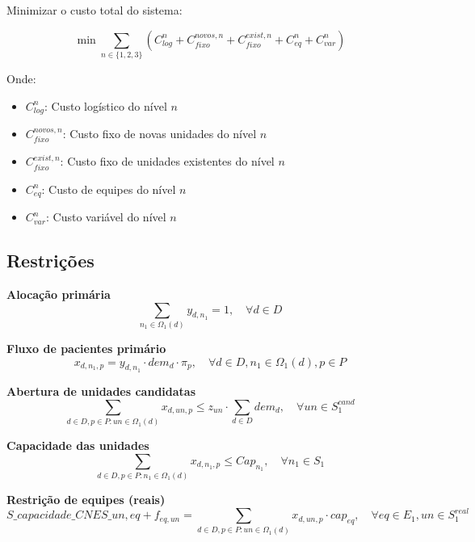 \documentclass{article}
\begin{document}
Minimizar o custo total do sistema:

\begin{equation}
\min \sum_{n \in \{1,2,3\}} \left( C_{log}^n + C_{fixo}^{novos,n} + C_{fixo}^{exist,n} + C_{eq}^n + C_{var}^n \right)
\end{equation}

Onde:
\begin{itemize}
    \item $C_{log}^n$: Custo logístico do nível $n$
    \item $C_{fixo}^{novos,n}$: Custo fixo de novas unidades do nível $n$
    \item $C_{fixo}^{exist,n}$: Custo fixo de unidades existentes do nível $n$
    \item $C_{eq}^n$: Custo de equipes do nível $n$
    \item $C_{var}^n$: Custo variável do nível $n$
\end{itemize}

\subsection{Restrições}

\textbf{Alocação primária}
\begin{equation}
\sum_{n_1 \in \Omega_1(d)} y_{d,n_1} = 1, \quad \forall d \in D \tag{1}
\end{equation}

\textbf{Fluxo de pacientes primário}
\begin{equation}
x_{d,n_1,p} = y_{d,n_1} \cdot dem_d \cdot \pi_p, \quad \forall d \in D, n_1 \in \Omega_1(d), p \in P \tag{2}
\end{equation}

\textbf{Abertura de unidades candidatas}
\begin{equation}
\sum_{d \in D, p \in P: un \in \Omega_1(d)} x_{d,un,p} \leq z_{un} \cdot \sum_{d \in D} dem_d, \quad \forall un \in S_1^{cand} \tag{3}
\end{equation}

\textbf{Capacidade das unidades}
\begin{equation}
\sum_{d \in D, p \in P: n_1 \in \Omega_1(d)} x_{d,n_1,p} \leq Cap_{n_1}, \quad \forall n_1 \in S_1 \tag{4}
\end{equation}

\textbf{Restrição de equipes (reais)}
\begin{equation}
S\_capacidade\_CNES\_{un,eq} + f_{eq,un} = \sum_{d \in D, p \in P: un \in \Omega_1(d)} x_{d,un,p} \cdot cap_{eq}, \quad \forall eq \in E_1, un \in S_1^{real} \tag{5}
\end{equation}
\end{document}
